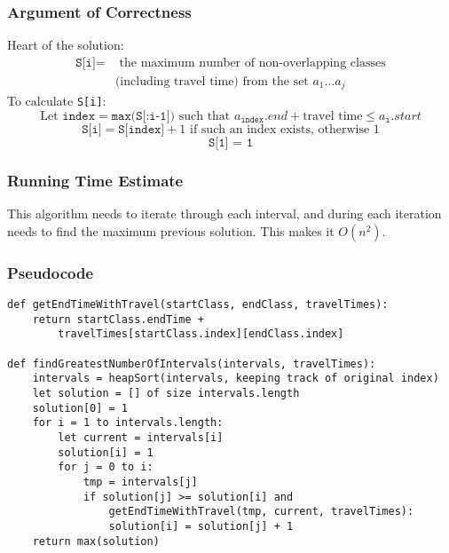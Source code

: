 \documentclass[letterpaper, 12pt]{math}
\begin{document}
\subsubsection*{Argument of Correctness}
Heart of the solution:
\begin{align*}
  \texttt{S[i]} =& \text{ the maximum number of non-overlapping classes} \\
  & \text{(including travel time) from the set } a_{1}\dots a_{j}
\end{align*}
To calculate \texttt{S[i]}:
\[ \text{Let } \texttt{index} = \texttt{max(S[:i-1])} \text{ such that }
  a_{\texttt{index}}.end + \text{travel time} \le a_{\texttt{i}}.start \]
\[ \texttt{S[i]} = \texttt{S[index]} + 1 \text{ if such an index exists,
  otherwise } 1 \]
\[ \texttt{S[1] = 1} \]

\subsubsection*{Running Time Estimate}
This algorithm needs to iterate through each interval, and during each
iteration needs to find the maximum previous solution. This makes it
\( O(n^2) \).

\subsubsection*{Pseudocode}
\begin{lstlisting}
def getEndTimeWithTravel(startClass, endClass, travelTimes):
    return startClass.endTime +
        travelTimes[startClass.index][endClass.index]

def findGreatestNumberOfIntervals(intervals, travelTimes):
    intervals = heapSort(intervals, keeping track of original index)
    let solution = [] of size intervals.length
    solution[0] = 1
    for i = 1 to intervals.length:
        let current = intervals[i]
        solution[i] = 1
        for j = 0 to i:
            tmp = intervals[j]
            if solution[j] >= solution[i] and
                getEndTimeWithTravel(tmp, current, travelTimes):
                solution[i] = solution[j] + 1
    return max(solution)
\end{lstlisting}
\end{document}
